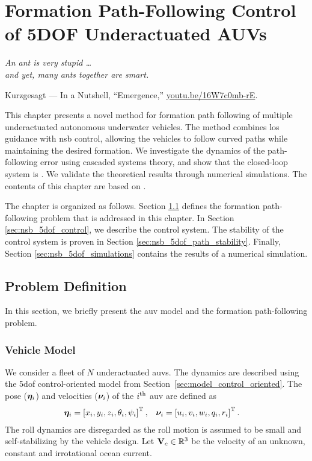 \chapter{Formation Path-Following Control of 5DOF Underactuated AUVs}
\label{chap:5dof_nsb}

\setlength{\epigraphwidth}{0.55\textwidth}
\epigraph{\it
    An ant is very stupid \dots \\ and yet, many ants together are smart.
}{
    Kurzgesagt --- In a Nutshell, ``Emergence,'' \url{youtu.be/16W7c0mb-rE}.
}

This chapter presents a novel method for formation path following of multiple underactuated autonomous underwater vehicles.
The method combines \acrlong{los} guidance with \acrlong{nsb} control, allowing the vehicles to follow curved paths while maintaining the desired formation.
We investigate the dynamics of the path-following error using cascaded systems theory, and show that the closed-loop system is .
We validate the theoretical results through numerical simulations.
The contents of this chapter are based on \cite{matouvs_formation_2022}.

The chapter is organized as follows.
Section \ref{sec:nsb_5dof_model} defines the formation path-following problem that is addressed in this chapter.
In Section \ref{sec:nsb_5dof_control}, we describe the control system.
The stability of the control system is proven in Section \ref{sec:nsb_5dof_path_stability}.
Finally, Section \ref{sec:nsb_5dof_simulations} contains the results of a numerical simulation.

\section{Problem Definition}
\label{sec:nsb_5dof_model}
In this section, we briefly present the \gls{auv} model and the formation path-following problem.

\subsection{Vehicle Model}
We consider a fleet of $N$ underactuated \glspl{auv}.
The dynamics are described using the 5\gls{dof} control-oriented model from Section~\ref{sec:model_control_oriented}.
The pose ($\bm{\eta}_i$) and velocities ($\bm{\nu}_i$) of the $i^{\rm th}$ \gls{auv} are defined as
\begin{align}
    \bm{\eta}_i &= \left[x_i, y_i, z_i, \theta_i, \psi_i\right]^{\mathrm{T}}, &
    \bm{\nu}_i &= \left[u_i, v_i, w_i, q_i, r_i\right]^{\mathrm{T}}.
\end{align}
The roll dynamics are disregarded as the roll motion is assumed to be small and self-stabilizing by the vehicle design.
Let $\mathbf{V}_c \in \mathbb{R}^3$ be the velocity of an unknown, constant and irrotational ocean current.

